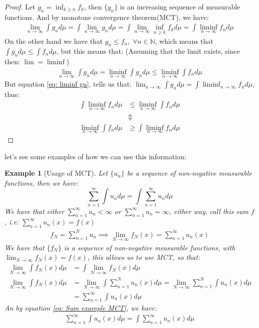 \documentclass{article}
\newcommand{\N}{\mathbb{N}}
\newtheorem{ex}{Example}
\newtheorem{proof}{Proof}
\begin{document}
\begin{proof}
Let $g_{n} = \inf_{k\geq n}f_{k}$, then $\{g_{n}\}$ is an increasing sequence of measurable functions. And by monotone convergence theorem(MCT), we have: 
\begin{align}
\label{eq: liminf gn}
\lim_{n\to \infty}\int g_{n}d\mu = \int \lim_{n\to \infty}g_{n}d\mu = \int \lim_{n\to \infty} \inf_{n\geq k}f_{k}d\mu = \int \liminf_{n\to \infty}f_{n}d\mu
\end{align}
On the other hand we have that $g_{n}\leq f_{n}, \; \forall n\in \N$, which means that $\int g_{n}d\mu \leq \int f_{n}d\mu$, but this means that: (Assuming that the limit exists, since then: $\lim = \liminf$)
\begin{align*}
\lim_{n\to \infty}\int g_{n}d\mu = \liminf_{n\to \infty}\int g_{n}d\mu \leq \liminf_{n\to \infty}\int f_{n}d\mu
\end{align*}
But equation \ref{eq: liminf gn}, tells us that: 
$\lim_{n\to \infty}\int g_{n}d\mu = \int \liminf_{n\to \infty}f_{n}d\mu$, thus: 
\begin{align*}
\int \liminf_{n\to \infty}f_{n}d\mu &\leq \liminf_{n\to \infty}\int f_{n}d\mu\\ 
&\Updownarrow \\
\liminf_{n\to \infty}\int f_{n}d\mu &\geq \int \liminf_{n\to \infty}f_{n}d\mu
\end{align*}
\end{proof}

let's see some examples of how we can use this information: 
\begin{ex}[Usage of MCT]
Let $\{u_{n}\}$ be a sequence of non-negative measurable functions, then we have: 
\[ \sum_{n=1}^{\infty}\int u_{n}d\mu = \int \sum_{n=1}^{\infty}u_{n}d\mu
\] 
We have that either $\sum_{n=1}^{\infty}u_{n} < \infty$ or $\sum_{n=1}^{\infty}u_{n} = \infty$, either way, call this sum $f$, i.e: 
$\sum_{n=1}^{\infty}u_{n}(x) = f(x)$
\begin{align*}
f_{N} = \sum_{n=1}^{N} u_{n} \implies \lim_{N\to \infty}f_{N}(x) = \sum_{n=1}^{\infty}u_{n}(x)    
\end{align*}
We have that $\{f_{N}\}$ is a sequence of non-negative measurable functions, with $\lim_{N\to \infty}f_{N}(x) = f(x)$, this allows us to use MCT, so that: 
\begin{align}
\label{eq: Sum example MCT}
\lim_{N\to \infty}\int f_{N}(x)d\mu &= \int \lim_{N\to \infty}f_{N}(x)d\mu \\ 
\lim_{N\to \infty}\int f_{N}(x)d\mu &= \lim_{N\to \infty}\int \sum_{n=1}^{N}u_{n}(x)d\mu = \lim_{N\to \infty} \sum_{n=1}^{N}\int u_{n}(x)d\mu \\ 
&= \sum_{n=1}^{\infty}\int u_{n}(x)d\mu
\end{align}
An by equation \ref{eq: Sum example MCT}, we have: 
\begin{align*}
\sum_{n=1}^{\infty}\int u_{n}(x) d\mu = \int \sum_{n=1}^{\infty}u_{n}(x)d\mu    
\end{align*}
\end{ex}
\end{document}
